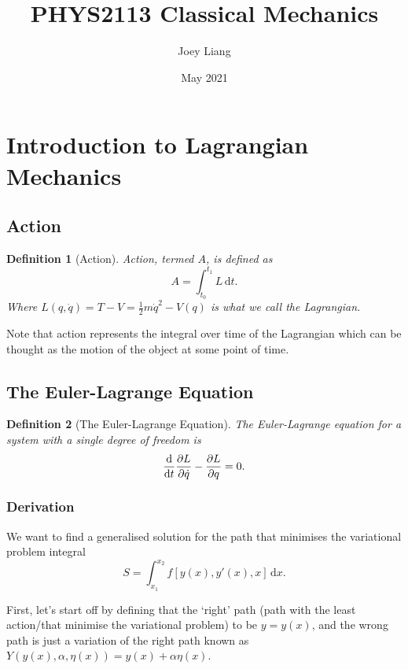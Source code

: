 \documentclass[a4paper]{article}
\title{PHYS2113 Classical Mechanics}
\author{Joey Liang}
\date{May 2021}
\newcommand{\dmr}[1]{\, \mathrm{d}#1} %
\newtheorem{definition}{Definition}[section]
\numberwithin{equation}{subsection}
\begin{document}
\maketitle

\newpage
\tableofcontents

\newpage
\section{Introduction to Lagrangian Mechanics}

\subsection{Action}
\begin{definition}[Action]
    Action, termed $A$, is defined as
    \begin{equation}
        A = \int_{t_0}^{t_1} L \dmr{t}.
    \end{equation}
    Where $L(q,\dot{q}) = T - V = \frac12 m \dot{q}^2 - V(q)$ is what we call the Lagrangian.
\end{definition}
\par Note that action represents the integral over time of the Lagrangian which can be thought as the motion of the object at some point of time.\cite{noauthor_action_2021}

\subsection{The Euler-Lagrange Equation}
\begin{definition}[The Euler-Lagrange Equation]
    The Euler-Lagrange equation for a system with a single degree of freedom is
    \begin{equation}
        \dv{t}\pdv{L}{\dot{q}} - \pdv{L}{q} = 0.
    \end{equation}
\end{definition}

\subsubsection{Derivation}
We want to find a generalised solution for the path that minimises the variational problem integral
\begin{equation}
    S = \int_{x_1}^{x_2} f[y(x),y'(x),x]\dmr{x}.
\end{equation}

First, let's start off by defining that the `right' path (path with the least action/that minimise the variational problem) to be $y = y(x)$, and the wrong path is just a variation of the right path known as $Y(y(x),\alpha,\eta(x)) = y(x)+\alpha\eta(x)$. 
\end{document}
